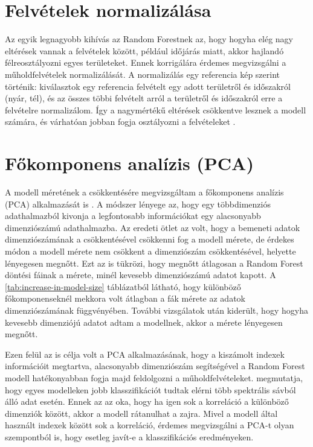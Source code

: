 \section{Felvételek normalizálása}
Az egyik legnagyobb kihívás az Random Forestnek az, hogy hogyha elég nagy eltérések vannak a felvételek között, például időjárás miatt, akkor hajlandó félreosztályozni egyes területeket. Ennek korrigálára érdemes megvizsgálni a műholdfelvételek normalizálását. A normalizálás egy referencia kép szerint történik: kiválasztok egy referencia felvételt egy adott területről és időszakról (nyár, tél), és az összes többi felvételt arról a területről és időszakról erre a felvételre normalizálom. Így a nagymértékű eltérések csökkentve lesznek a modell számára, és várhatóan jobban fogja osztályozni a felvételeket . 

\section{Főkomponens analízis (PCA)}
\label{ch:pca-methodology}

A modell méretének a csökkentésére megvizsgáltam a főkomponens analízis (PCA) alkalmazását is \cite{pca2010}. A módszer lényege az, hogy egy többdimenziós adathalmazból kivonja a legfontosabb információkat egy alacsonyabb dimenziószámú adathalmazba. Az eredeti ötlet az volt, hogy a bemeneti adatok dimenziószámának a csökkentésével csökkenni fog a modell mérete, de érdekes módon a modell mérete nem csökkent a dimenziószám csökkentésével, helyette lényegesen megnőtt. Ezt az is tükrözi, hogy megnőtt átlagosan a Random Forest döntési fáinak a mérete, minél kevesebb dimenziószámú adatot kapott. A \ref{tab:increase-in-model-size} táblázatból látható, hogy különböző főkomponenseknél mekkora volt átlagban a fák mérete az adatok dimenziószámának függvényében. További vizsgálatok után kiderült, hogy hogyha kevesebb dimenziójú adatot adtam a modellnek, akkor a mérete lényegesen megnőtt. 

Ezen felül az is célja volt a PCA alkalmazásának, hogy a kiszámolt indexek információit megtartva, alacsonyabb dimenziószám segítségével a Random Forest modell hatékonyabban fogja majd feldolgozni a műholdfelvételeket. \cite{Howley2005} megmutatja, hogy egyes modelleken jobb klasszifikációt tudtak elérni több spektrális sávból álló adat esetén. Ennek az az oka, hogy ha igen sok a korreláció a különböző dimenziók között, akkor a modell rátanulhat a zajra. Mivel a modell által használt indexek között sok a korreláció, érdemes megvizsgálni a PCA-t olyan szempontból is, hogy esetleg javít-e a klasszifikációs eredményeken. 

